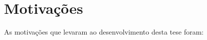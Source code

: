 \section{Motivações}\label{sec:justificativa_e_motivacao}



As motivações que levaram ao desenvolvimento desta tese foram:

